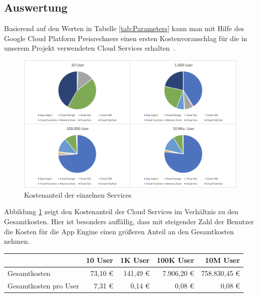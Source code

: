 \documentclass{article}
\begin{document}
\subsection{Auswertung}

Basierend auf den Werten in Tabelle \ref{tab:Parameters} kann man mit Hilfe des Google Cloud Platform Preisrechners einen ersten Kostenvoranschlag für die in unserem Projekt verwendeten Cloud Services erhalten~\cite{google-pricing}.

\FloatBarrier

\begin{figure}[H]
\centering
\label{fig:pricingUsers}
\includegraphics[width=\textwidth]{images/pricing-users}
\caption{Kostenanteil der einzelnen Services}
\end{figure}

Abbildung \ref{fig:pricingUsers} zeigt den Kostenanteil der Cloud Services im Verhältnis zu den Gesamtkosten. Hier ist besonders auffällig, dass mit steigender Zahl der Benutzer die Kosten für die App Engine einen größeren Anteil an den Gesamtkosten nehmen.

\FloatBarrier
\begin{center}\label{tab:totalCost}
    \begin{tabular}{|l||r|r|r|r|}
    \hline
         & 10 User & 1K User & 100K User & 10M User \\ \hline\hline
        Gesamtkosten & 73,10 \euro{} & 141,49 \euro{} & 7.906,20 \euro{} & 758.830,45 \euro{} \\ \hline
        Gesamtkosten pro User & 7,31 \euro{} & 0,14 \euro{} & 0,08 \euro{} & 0,08 \euro{} \\ \hline
    \end{tabular}
\end{center}
\end{document}
